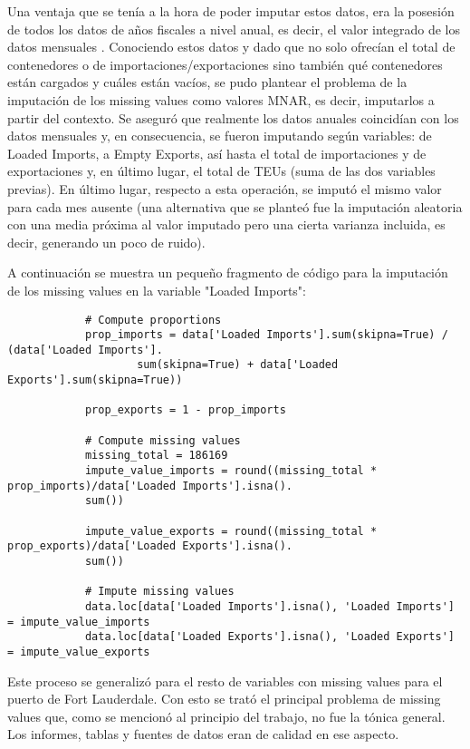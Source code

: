 \documentclass[12pt]{article}
\begin{document}
		Una ventaja que se tenía a la hora de poder imputar estos datos, era la posesión de todos los datos de años fiscales a nivel anual, es decir, el valor integrado de los datos mensuales \cite{waterborne2024commerce}. Conociendo estos datos y dado que no solo ofrecían el total de contenedores o de importaciones/exportaciones sino también qué contenedores están cargados y cuáles están vacíos, se pudo plantear el problema de la imputación de los missing values como valores MNAR, es decir, imputarlos a partir del contexto. Se aseguró que realmente los datos anuales coincidían con los datos mensuales y, en consecuencia, se fueron imputando según variables: de Loaded Imports, a Empty Exports, así hasta el total de importaciones y de exportaciones y, en último lugar, el total de TEUs (suma de las dos variables previas). En último lugar, respecto a esta operación, se imputó el mismo valor para cada mes ausente (una alternativa que se planteó fue la imputación aleatoria con una media próxima al valor imputado pero una cierta varianza incluida, es decir, generando un poco de ruido).
		
		A continuación se muestra un pequeño fragmento de código para la imputación de los missing values en la variable "Loaded Imports":
		
		\begin{verbatim}
			# Compute proportions
			prop_imports = data['Loaded Imports'].sum(skipna=True) / (data['Loaded Imports'].
					sum(skipna=True) + data['Loaded Exports'].sum(skipna=True))
					
			prop_exports = 1 - prop_imports
			
			# Compute missing values
			missing_total = 186169
			impute_value_imports = round((missing_total * prop_imports)/data['Loaded Imports'].isna().
			sum())
			
			impute_value_exports = round((missing_total * prop_exports)/data['Loaded Exports'].isna().
			sum())
			
			# Impute missing values
			data.loc[data['Loaded Imports'].isna(), 'Loaded Imports'] = impute_value_imports
			data.loc[data['Loaded Exports'].isna(), 'Loaded Exports'] = impute_value_exports
		\end{verbatim}
	
		Este proceso se generalizó para el resto de variables con missing values para el puerto de Fort Lauderdale. Con esto se trató el principal problema de missing values que, como se mencionó al principio del trabajo, no fue la tónica general. Los informes, tablas y fuentes de datos eran de calidad en ese aspecto.
		
\end{document}
